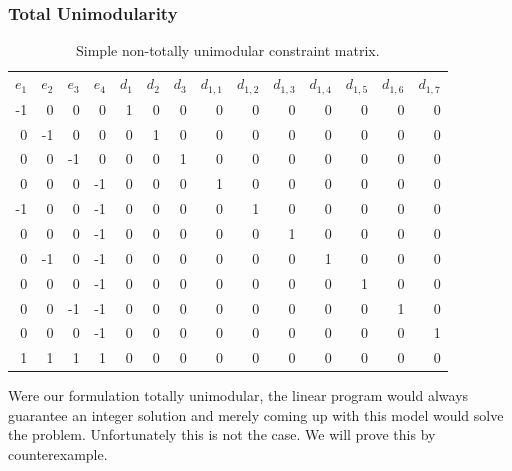 \subsubsection{Total Unimodularity}

\begin{table}[tbh]
\centering
\begin{tabular}{rrrr|rrrrrrrrrr}
$e_1$ & $e_2$ & $e_3$ & $e_4$ & $d_1$ & $d_2$ & $d_3$& $d_{1,1}$ & $d_{1,2}$ & $d_{1,3}$ & $d_{1,4}$ & $d_{1,5}$ & $d_{1,6}$ & $d_{1,7}$  \\
-1 &  0 &  0 &  0 & 1 & 0 & 0 & 0 & 0 & 0 & 0 & 0 & 0 & 0\\
 0 & -1 &  0 &  0 & 0 & 1 & 0 & 0 & 0 & 0 & 0 & 0 & 0 & 0\\
 0 &  0 & -1 &  0 & 0 & 0 & 1 & 0 & 0 & 0 & 0 & 0 & 0 & 0\\
 0 &  0 &  0 & -1 & 0 & 0 & 0 & 1 & 0 & 0 & 0 & 0 & 0 & 0\\
\cellcolor{gray}-1 &  \cellcolor{gray}0 &  \cellcolor{gray}0 & \cellcolor{gray}-1 & 0 & 0 & 0 & 0 & 1 & 0 & 0 & 0 & 0 & 0\\
 0 &  0 &  0 & -1 & 0 & 0 & 0 & 0 & 0 & 1 & 0 & 0 & 0 & 0\\
 \cellcolor{gray}0 & \cellcolor{gray}-1 &  \cellcolor{gray}0 & \cellcolor{gray}-1 & 0 & 0 & 0 & 0 & 0 & 0 & 1 & 0 & 0 & 0\\
 0 &  0 &  0 & -1 & 0 & 0 & 0 & 0 & 0 & 0 & 0 & 1 & 0 & 0\\
 \cellcolor{gray}0 &  \cellcolor{gray}0 & \cellcolor{gray}-1 & \cellcolor{gray}-1 & 0 & 0 & 0 & 0 & 0 & 0 & 0 & 0 & 1 & 0\\
 0 &  0 &  0 & -1 & 0 & 0 & 0 & 0 & 0 & 0 & 0 & 0 & 0 & 1\\
\cellcolor{gray} 1 & \cellcolor{gray} 1 & \cellcolor{gray} 1 & \cellcolor{gray} 1 & 0 & 0 & 0 & 0 & 0 & 0 & 0 & 0 & 0 & 0\\
\end{tabular}
\caption{Simple non-totally unimodular constraint matrix.}
\label{table:notUni}
\end{table}

Were our formulation totally unimodular, the linear program would always guarantee an integer solution and merely coming up with this model would solve the problem.  Unfortunately this is not the case.  We will prove this by counterexample.

